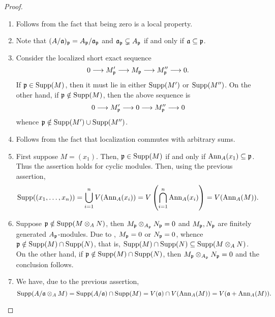 \begin{proof}
\begin{enumerate}[label=(\alph*)]
    \item Follows from the fact that being zero is a local property. 
    \item Note that $(A/\mathfrak a)_\mathfrak p = A_\mathfrak p/\mathfrak a_\mathfrak p$ and $\mathfrak a_\mathfrak p\subsetneq A_\mathfrak p$ if and only if $\mathfrak a\subseteq\mathfrak p$.
    \item Consider the localized short exact sequence 
    \begin{equation*}
        0\longrightarrow M'_\mathfrak p\longrightarrow M_\mathfrak p\longrightarrow M''_\mathfrak p\longrightarrow 0.
    \end{equation*}
    If $\mathfrak p\in\operatorname{Supp}(M)$, then it must lie in either $\operatorname{Supp}(M')$ or $\operatorname{Supp}(M'')$. On the other hand, if $\mathfrak p\notin\operatorname{Supp}(M)$, then the above sequence is 
    \begin{equation*}
        0\longrightarrow M'_\mathfrak p\longrightarrow 0\longrightarrow M''_\mathfrak p\longrightarrow 0
    \end{equation*}
    whence $\mathfrak p\notin\operatorname{Supp}(M')\cup\operatorname{Supp}(M'')$. 
    \item Follows from the fact that localization commutes with arbitrary sums.
    \item First suppose $M = (x_1)$. Then, $\mathfrak p\in\operatorname{Supp}(M)$ if and only if $\operatorname{Ann}_A(x_1)\subseteq\mathfrak p$. Thus the assertion holds for cyclic modules. Then, using the previous assertion,
    \begin{equation*}
        \operatorname{Supp}((x_1,\dots,x_n)) = \bigcup_{i = 1}^n V(\operatorname{Ann}_A(x_i)) = V\left(\bigcap_{i = 1}^n\operatorname{Ann}_A(x_i)\right) = V(\operatorname{Ann}_A(M)).
    \end{equation*}
    \item Suppose $\mathfrak p\notin\operatorname{Supp}(M\otimes_A N)$, then $M_\mathfrak p\otimes_{A_\mathfrak p}N_\mathfrak p = 0$ and $M_\mathfrak p, N_\mathfrak p$ are finitely generated $A_\mathfrak p$-modules. Due to , $M_\mathfrak p = 0$ or $N_\mathfrak p = 0$, whence $\mathfrak p\notin\operatorname{Supp}(M)\cap\operatorname{Supp}(N)$, that is, $\operatorname{Supp}(M)\cap\operatorname{Supp}(N)\subseteq\operatorname{Supp}(M\otimes_A N)$. On the other hand, if $\mathfrak p\notin\operatorname{Supp}(M)\cap\operatorname{Supp}(N)$, then $M_\mathfrak p\otimes_{A_\mathfrak p} N_\mathfrak p = 0$ and the conclusion follows.

    \item We have, due to the previous assertion, 
    \begin{equation*}
        \operatorname{Supp}(A/\mathfrak a\otimes_A M) = \operatorname{Supp}(A/\mathfrak a)\cap\operatorname{Supp}(M) = V(\mathfrak a)\cap V(\operatorname{Ann}_A(M)) = V(\mathfrak a + \operatorname{Ann}_A(M)).\qedhere
    \end{equation*}
\end{enumerate}
\end{proof}

